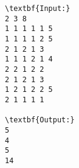 \begin{verbatim}
\textbf{Input:}
2 3 8
1 1 1 1 1 5
1 1 1 1 2 5
2 1 2 1 3
1 1 1 2 1 4
2 2 1 2 2
2 1 2 1 3
1 2 1 2 2 5
2 1 1 1 1

\textbf{Output:}
5
4
5
14
\end{verbatim}